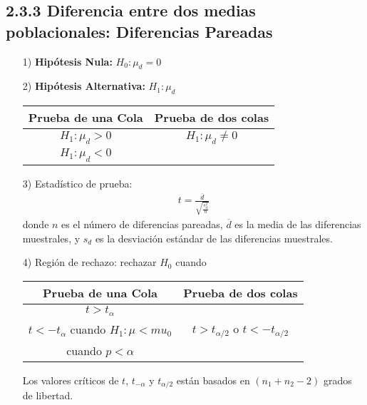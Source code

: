 \begin{frame}
\begin{frame}
\subsection{2.3.3 Diferencia entre dos medias poblacionales: Diferencias Pareadas}




\begin{itemize}
\item[1) ] \textbf{Hip\'otesis Nula:} $H_{0}:\mu_{d}=0$
\item[2) ] \textbf{Hip\'otesis Alternativa: } $H_{1}:\mu_{d}$
\begin{tabular}{cc}\hline
\textbf{Prueba de una Cola} & \textbf{Prueba de dos colas}\\\hline
$H_{1}:\mu_{d}>0$ & $H_{1}:\mu_{d}\neq 0$\\ 
$H_{1}:\mu_{d}<0$&\\
\end{tabular}
\item[3) ] Estad\'istico de prueba:
\begin{eqnarray*}
t=\frac{\overline{d}}{\sqrt{\frac{s_{d}^{2}}{n}}}
\end{eqnarray*}
donde $n$ es el n\'umero de diferencias pareadas, $\overline{d}$ es la media de las diferencias muestrales, y $s_{d}$ es la desviaci\'on est\'andar de las diferencias muestrales.



\end{itemize}






\begin{itemize}
\item[4) ] Regi\'on de rechazo: rechazar $H_{0}$ cuando
\begin{tabular}{cc}\hline
\textbf{Prueba de una Cola} & \textbf{Prueba de dos colas}\\\hline
$t>t_{\alpha}$ & \\
$t<-t_{\alpha}$ cuando $H_{1}:\mu<mu_{0}$&$t>t_{\alpha/2}$ o $t<-t_{\alpha/2}$\\
 cuando $p<\alpha$&\\
\end{tabular}

Los valores cr\'iticos de $t$, $t_{-\alpha}$ y $t_{\alpha/2}$ est\'an basados en $\left(n_{1}+n_{2}-2\right)$ grados de libertad.

\end{itemize}






\end{frame}
\end{frame}
